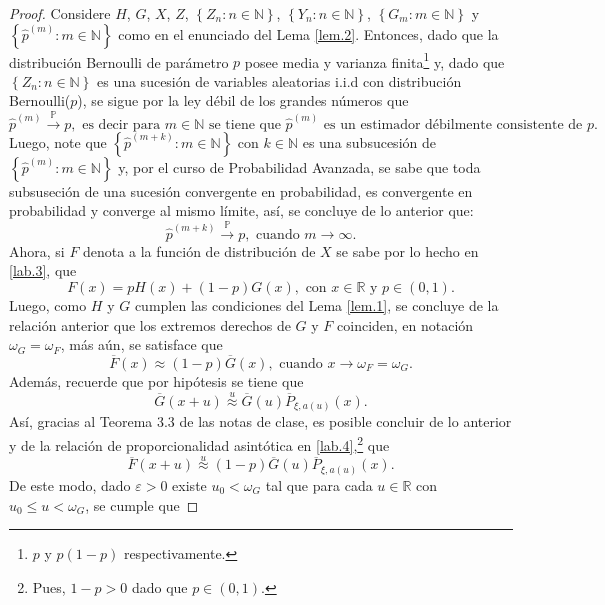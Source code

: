 \documentclass[10.5pt,notitlepage]{article}
\newcommand{\PP}{\mathbb{P}}
\newcommand{\RR}{\mathbb{R}}
\newcommand{\ee}{\varepsilon}
\newcommand{\NN}{\mathbb{N}}
\newcommand{\toPP}{\overset{\PP}{\to}}
\newcommand{\approxu}{\overset{u}{\approx}}
\newcommand{\kis}[1]{\left\{ #1 \right\}}
\theoremstyle{plain}
\begin{document}
\begin{proof}
Considere \(H\), \(G\), \(X\), \(Z\), \(\kis{Z_{n} : n \in \NN}\), \(\kis{Y_{n} : n \in \NN}\), \(\kis{G_{m} : m \in \NN}\) y \(\kis{\hat{p}^{(m)} : m \in \NN}\) como en el enunciado del Lema \ref{lem.2}. Entonces, dado que la distribución Bernoulli de parámetro \(p\) posee media y varianza finita\footnote{\(p\) y \(p(1 - p)\) respectivamente.} y, dado que \(\kis{Z_{n} : n \in \NN}\) es una sucesión de variables aleatorias i.i.d con distribución Bernoulli(\(p\)), se sigue por la ley débil de los grandes números que 
\begin{equation*}
\hat{p}^{(m)} \toPP p, \text{ es decir para \(m \in \NN\) se tiene que } \hat{p}^{(m)} \text{ es un estimador débilmente consistente de \(p\).}    
\end{equation*}
Luego, note que \(\kis{\hat{p}^{(m+k)} : m \in \NN}\) con \(k\in \NN\) es una subsucesión de \(\kis{\hat{p}^{(m)} : m \in \NN}\) y, por el curso de Probabilidad Avanzada, se sabe que toda subsuseción de una sucesión convergente en probabilidad, es convergente en probabilidad y converge al mismo límite, así, se concluye de lo anterior que: 
\begin{equation}\label{lab.4}
    \hat{p}^{(m + k)} \toPP p, \text{ cuando } m \to \infty.   
\end{equation}
Ahora, si \(F\) denota a la función de distribución de \(X\) se sabe por lo hecho en \eqref{lab.3}, que 
\[
F(x) = pH(x) + (1 - p)G(x), \text{ con } x \in \RR \text{ y } p \in (0,1). 
\]
Luego, como \(H\) y \(G\) cumplen las condiciones del Lema \ref{lem.1}, se concluye de la relación anterior que los extremos derechos de \(G\) y \(F\) coinciden, en notación  \(\omega_{G} = \omega_{F}\), más aún, se satisface que 
\begin{equation}\label{lab.5}
    \overline{F}(x) \approx (1 - p) \overline{G}(x), \text{ cuando } x \to \omega_{F} = \omega_{G}.  
\end{equation}
Además, recuerde que por hipótesis se tiene que 
\[
\overline{G}(x + u) \approxu \overline{G}(u)\overline{P}_{\xi,a(u)}(x). 
\]
Así, gracias al Teorema 3.3 de las notas de clase, es posible concluir de lo anterior y de la relación de proporcionalidad asintótica en \eqref{lab.4},\footnote{Pues, \(1 - p >0 \) dado que \(p \in (0,1)\).} que
\begin{equation*}
\overline{F}(x + u) \approxu (1 - p)\overline{G}(u)\overline{P}_{\xi,a(u)}(x).     
\end{equation*}
De este modo, dado \( \ee> 0\) existe \(u_0<\omega_G\) tal que para cada \(u\in \RR\) con \(u_0 \leq u < \omega_G\), se cumple que 

\end{proof}
\end{document}

